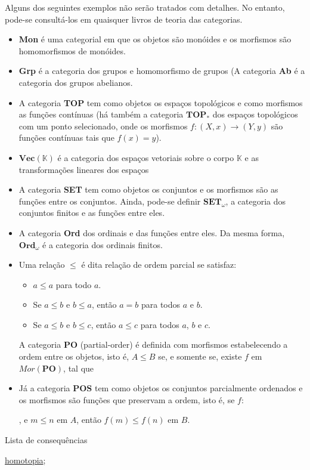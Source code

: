 \begin{ex}
	Alguns dos seguintes exemplos não serão tratados com detalhes. No entanto, pode-se consultá-los em quaisquer livros de teoria das categorias.
\begin{itemize}
\item \textbf{Mon} é uma categorial em que os objetos são monóides e os morfismos são homomorfismos de monóides.
\item \textbf{Grp} é a categoria dos grupos e homomorfismo de grupos (A categoria \textbf{Ab} é a categoria dos grupos abelianos.
\item A categoria \textbf{TOP} tem como objetos os espaços topológicos e como morfismos as funções contínuas (há também a categoria $\mathbf{TOP_*}$ dos espaços topológicos com um ponto selecionado, onde os morfismos $f:(X,x) \longrightarrow (Y,y)$ são funções contínuas tais que $f(x) = y$).
\item $\mathbf{Vec(\mathbb{K})}$ é a categoria dos espaços vetoriais sobre o corpo $\mathbb{K}$ e as transformações lineares dos espaços
\item A categoria \textbf{SET} tem como objetos os conjuntos e os morfismos são as funções entre os conjuntos. Ainda, pode-se definir $\mathbf{SET}_\omega$, a categoria dos conjuntos finitos e as funções entre eles.
\item A categoria \textbf{Ord} dos ordinais e das funções entre eles. Da mesma forma, $\mathbf{Ord}_\omega$ é a categoria dos ordinais finitos.

\item Uma relação $\leq$ é dita relação de ordem parcial se satisfaz:
\begin{itemize}
    \item $a \leq a$ para todo $a$.
    \item Se $a \leq b$ e $b \leq a$, então $a = b$ para todos $a$ e $b$.
    \item Se $a \leq b$ e $b \leq c$, então $a \leq c$ para todos $a$, $b$ e $c$.
\end{itemize}
A categoria $\mathbf{PO}$ (partial-order) é definida com morfismos estabelecendo a ordem entre os objetos, isto é, $A \leq B$ se, e somente se, existe $f$ em $Mor(\mathbf{PO})$, tal que %
\item Já a categoria \textbf{POS} tem como objetos os conjuntos parcialmente ordenados e os morfismos são funções que preservam a ordem, isto é, se $f:$ %
, e $m \leq n$ em $A$, então $f(m) \leq f(n)$ em $B$.




\end{itemize}

\end{ex}


\begin{titlemize}{Lista de consequências}
	\item \hyperref[homotopia]{homotopia};\\ %
	\item \hyperref[]{}
\end{titlemize}
